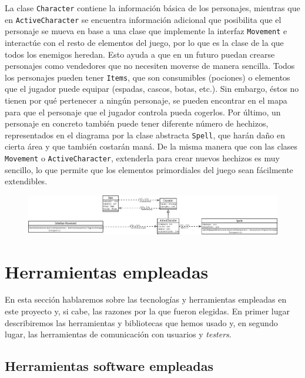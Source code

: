 La clase \texttt{Character} contiene la información básica de los personajes, mientras que en \texttt{ActiveCharacter} se encuentra información adicional que posibilita que el personaje se mueva en base a una clase que implemente la interfaz \texttt{Movement} e interactúe con el resto de elementos del juego, por lo que es la clase de la que todos los enemigos heredan. Esto ayuda a que en un futuro puedan crearse personajes como vendedores que no necesiten moverse de manera sencilla. 
Todos los personajes pueden tener \texttt{Items}, que son consumibles (pociones) o elementos que el jugador puede equipar (espadas, cascos, botas, etc.). Sin embargo, éstos no tienen por qué pertenecer a ningún personaje, se pueden encontrar en el mapa para que el personaje que el jugador controla pueda cogerlos.
Por último, un personaje en concreto también puede tener diferente número de hechizos, representados en el diagrama por la clase abstracta \texttt{Spell}, que harán daño en cierta área y que también costarán maná. De la misma manera que con las clases \texttt{Movement} o \texttt{ActiveCharacter}, extenderla para crear nuevos hechizos es muy sencillo, lo que permite que los elementos primordiales del juego sean fácilmente extendibles.

\begin{figure}
    \includegraphics[width=\textwidth,height=0.15\textwidth]{./img/charactersitems.png}
  \label{fig:charactersitems}
\end{figure}

\section{Herramientas empleadas}

En esta sección hablaremos sobre las tecnologías y herramientas empleadas en este proyecto y, si cabe, las razones por la que fueron elegidas. En primer lugar describiremos las herramientas y bibliotecas que hemos usado y, en segundo lugar, las herramientas de comunicación con usuarios y \textit{testers}.

\subsection{Herramientas software empleadas}

